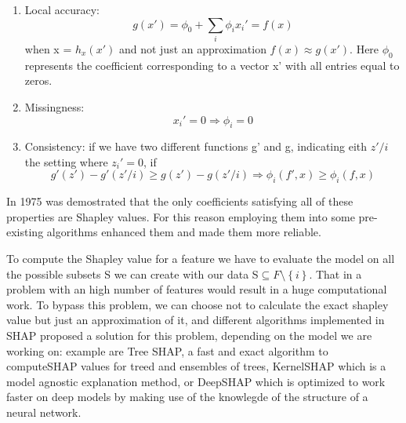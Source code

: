 \documentclass[a4paper,11pt]{article}
\begin{document}
\begin{enumerate}
\item Local accuracy:
\begin{equation}
g(x') =\phi_0 + \sum_i \phi_i x_i' = f(x)
\end{equation} when x = $h_x(x')$ and not just an approximation $f(x) \approx g(x')$. Here $\phi_0$ represents the coefficient corresponding to a vector x' with all entries equal to zeros.
\item Missingness:
\begin{equation}
x_i' = 0 \Longrightarrow \phi_i = 0
\end{equation}
\item Consistency: if we have two different functions g' and g, indicating eith $z' / i$ the setting where $z_i' = 0$, if
\begin{equation}
 g'(z') - g'(z' / i) \ge g(z') - g(z' / i) \Longrightarrow \phi_i(f', x) \ge \phi_i(f, x)
\end{equation}
\end{enumerate}

In 1975 was demostrated that the only coefficients satisfying all of these properties are Shapley values.
For this reason employing them into some pre-existing algorithms enhanced them and made them more reliable.




%

To compute the Shapley value for a feature we have to evaluate the model on all the possible subsets S we can create with our data S$\subseteq F \setminus \left\{i\right\}$. That in a problem with an high number of features would result in a huge computational work. To bypass this problem, we can choose not to calculate the exact shapley value but just an approximation of it, and different algorithms implemented in SHAP proposed a solution for this problem, depending on the model we are working on: example are Tree SHAP, a fast and exact algorithm to computeSHAP values for treed and ensembles of trees, KernelSHAP which is a model agnostic explanation method, or DeepSHAP which is optimized to work faster on deep models by making use of the knowlegde of the structure of a neural network.
\end{document}
